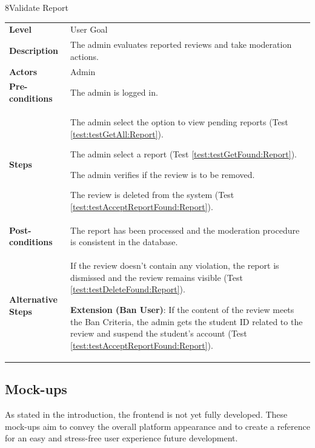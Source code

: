\begin{usecasetable}{8}{Validate Report}
	\begin{tabularx}{\textwidth}{@{} l|X @{}}
		\textbf{Level} & User Goal \\
		\textbf{Description} & The admin evaluates reported reviews and take moderation actions. \\
		\textbf{Actors} & Admin \\
		\textbf{Pre-conditions} & The admin is logged in. \\
		\textbf{Steps} &
		\begin{tabenum}
			\item The admin select the option to view pending reports (Test \ref{test:testGetAll:Report}).
			\item The admin select a report (Test \ref{test:testGetFound:Report}).
			\item The admin verifies if the review is to be removed.
			\item The review is deleted from the system (Test \ref{test:testAcceptReportFound:Report}).
		\end{tabenum} \\
		\textbf{Post-conditions} & The report has been processed and the moderation procedure is consistent in the database. \\
		\textbf{Alternative Steps} & \begin{tabitem}
			\item[3a.] If the review  doesn't contain any violation, the report is dismissed and the review remains visible (Test \ref{test:testDeleteFound:Report}).
			\item[4a.] \textbf{Extension (Ban User)}: If the content of the review meets the Ban Criteria, the admin gets the student ID related to the review and suspend the student's account (Test \ref{test:testAcceptReportFound:Report}).
		\end{tabitem}
	\end{tabularx}
\end{usecasetable}

\pagebreak

\subsection{Mock-ups} \label{mock-ups}
As stated in the introduction, the frontend is not yet fully developed. These mock-ups aim to convey the overall platform appearance and to create a reference for an easy and stress-free user experience future development. 

